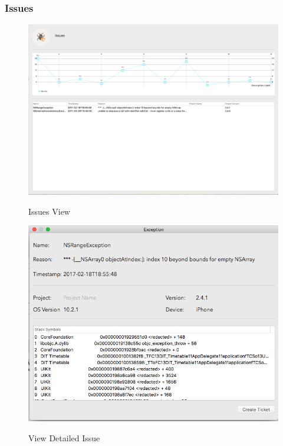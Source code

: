 \subsubsection{Issues}

\begin{figure}[!h]
    \caption{Issues View}
    \centering
    \includegraphics[width=150mm]{images/dashboard/crashes}
    \label{fig:crashes-view}
\end{figure} 

\begin{figure}[!h]
    \caption{View Detailed Issue}
    \centering
    \includegraphics[width=150mm]{images/dashboard/view_crash}
    \label{fig:view-crash}
\end{figure} 


